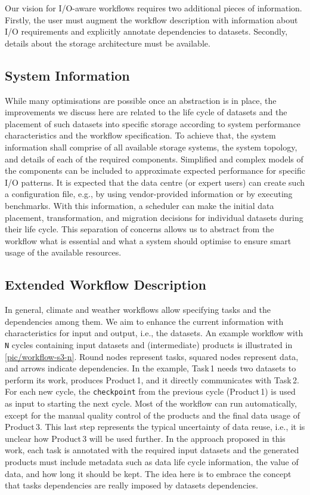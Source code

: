 \documentclass{superfri}
\begin{document}
Our vision for I/O-aware workflows requires two additional pieces of information.
Firstly, the user must augment the workflow description with information about I/O requirements and explicitly annotate dependencies to datasets.
Secondly, details about the storage architecture must be available.

\subsection{System Information}

While many optimisations are possible once an abstraction is in place, the improvements we discuss here are related to the life cycle of datasets and the placement of such datasets into specific storage according to system performance characteristics and the workflow specification.
To achieve that, the system information shall comprise of all available storage systems, the system topology, and details of each of the required components.
Simplified and complex models of the components can be included to approximate expected performance for specific I/O patterns.
It is expected that the data centre (or expert users) can create such a configuration file, e.g., by using vendor-provided information or by executing benchmarks.
With this information, a scheduler can make the initial data placement, transformation, and migration decisions for individual datasets during their life cycle.
This separation of concerns allows us to abstract from the workflow what is essential and what a system should optimise to ensure smart usage of the available resources.

\subsection{Extended Workflow Description}

In general, climate and weather workflows allow specifying tasks and the dependencies among them.
We aim to enhance the current information with characteristics for input and output, i.e., the datasets.
An example workflow with \texttt{N} cycles containing input datasets and (intermediate) products is illustrated in \cref{pic/workflow-s3-n}.
Round nodes represent tasks, squared nodes represent data, and arrows indicate dependencies.
In the example, Task\,1 needs two datasets to perform its work, produces Product\,1, and it directly communicates with Task\,2.
For each new cycle, the \texttt{checkpoint} from the previous cycle (Product\,1) is used as input to starting the next cycle.
Most of the workflow can run automatically, except for the manual quality control of the products and the final data usage of Product\,3.
This last step represents the typical uncertainty of data reuse, i.e., it is unclear how Product\,3 will be used further.
In the approach proposed in this work, each task is annotated with the required input datasets and the generated products must include metadata such as data life cycle information, the value of data, and how long it should be kept.
The idea here is to embrace the concept that tasks dependencies are really imposed by datasets dependencies.
\end{document}
